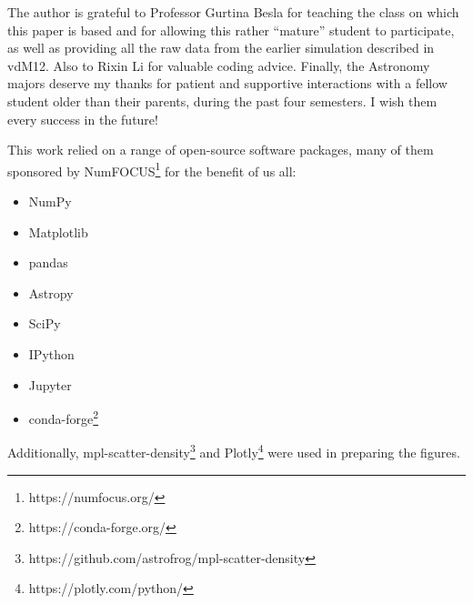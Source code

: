 \documentclass[twocolumn]{aastex63}
\begin{document}
The author is grateful to Professor Gurtina Besla for teaching the class on which this paper is based and for allowing this rather ``mature'' student to participate, as well as providing all the raw data from the earlier simulation described in vdM12. Also to Rixin Li for valuable coding advice. Finally, the Astronomy majors deserve my thanks for patient and supportive interactions with a fellow student older than their parents, during the past four semesters. I wish them every success in the future!

This work relied on a range of open-source software packages, many of them sponsored by NumFOCUS\footnote{https://numfocus.org/} for the benefit of us all: 

\begin{itemize}
  \setlength\itemsep{-1mm}
	\item NumPy \citep{van_der_walt_numpy_2011}
	\item Matplotlib \citep{hunter_matplotlib_2007}
	\item pandas \citep{mckinney-proc-scipy-2010}
	\item Astropy \citep{astropy:2013}
	\item SciPy \citep{2020SciPy-NMeth}
	\item IPython \citep{perez_ipython_2007}
	\item Jupyter \citep{Kluyver:2016aa}
	\item conda-forge\footnote{https://conda-forge.org/}
\end{itemize}

 Additionally, mpl-scatter-density\footnote{https://github.com/astrofrog/mpl-scatter-density} and Plotly\footnote{https://plotly.com/python/} were used in preparing the figures.


{}

\end{document}
